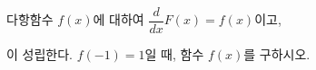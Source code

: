 다항함수 $f(x)$에 대하여 $\dfrac{d}{dx}F(x)=f(x)$이고,\par\smallskip{}\par\smallskip\noindent 이 성립한다. $f(-1)=1$일 때, 함수 $f(x)$를 구하시오.
